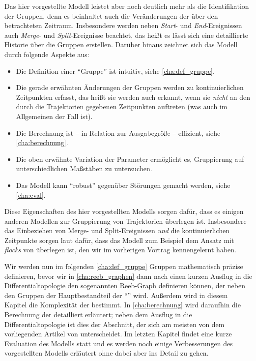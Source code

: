 Das hier vorgestellte Modell leistet aber noch deutlich mehr als die Identifikation der Gruppen, denn es beinhaltet auch die Veränderungen der \GrpStruktur über den betrachteten Zeitraum.
Insbesondere werden neben \emph{Start}- und \emph{End}-Ereignissen auch \emph{Merge}- und \emph{Split}-Ereignisse beachtet, das heißt es lässt sich eine detaillierte Historie über die Gruppen erstellen.
Darüber hinaus zeichnet sich das Modell durch folgende Aspekte aus:
\begin{itemize}
	\item Die Definition einer \enquote{Gruppe} ist intuitiv, siehe \cref{cha:def_gruppe}.
	\item Die gerade erwähnten Änderungen der Gruppen werden zu kontinuierlichen Zeitpunkten erfasst, das heißt sie werden auch erkannt, wenn sie \emph{nicht} an den durch die Trajektorien gegebenen Zeitpunkten auftreten (was auch im Allgemeinen der Fall ist).
	\item Die Berechnung ist -- in Relation zur Ausgabegröße -- effizient, siehe \cref{cha:berechnung}.
	\item Die oben erwähnte Variation der Parameter ermöglicht es, Gruppierung auf unterschiedlichen Maßstäben zu untersuchen.
	\item Das Modell kann \enquote{robust} gegenüber Störungen gemacht werden, siehe \cref{cha:eval}.
\end{itemize}
Diese Eigenschaften des hier vorgestellten Modells sorgen dafür, dass es einigen anderen Modellen zur Gruppierung von Trajektorien überlegen ist.
Insbesondere das Einbeziehen von Merge- und Split-Ereignissen \emph{und} die kontinuierlichen Zeitpunkte sorgen laut \textcite{buchin2015} dafür, dass das Modell zum Beispiel dem Ansatz mit \emph{flocks} von \textcite{benkert_flocks} überlegen ist, den wir im vorherigen Vortrag kennengelernt haben.

Wir werden nun im folgenden \cref{cha:def_gruppe} Gruppen mathematisch präzise definieren, bevor wir in \cref{cha:reeb_graphen} dann nach einen kurzen Ausflug in die Differentialtopologie den sogenannten Reeb-Graph definieren können, der neben den Gruppen der Hauptbestandteil der \enquote{\GrpStruktur} wird.
Außerdem wird in diesem Kapitel die Komplexität der \GrpStruktur bestimmt.
In \cref{cha:berechnung} wird daraufhin die Berechnung der \GrpStruktur detailliert erläutert; neben dem Ausflug in die Differentialtopologie ist dies der Abschnitt, der sich am meisten von dem vorliegenden Artikel von \textcite{buchin2015} unterscheidet.
Im letzten Kapitel findet eine kurze Evaluation des Modells statt und es werden noch einige Verbesserungen des vorgestellten Modells erläutert ohne dabei aber ins Detail zu gehen.
